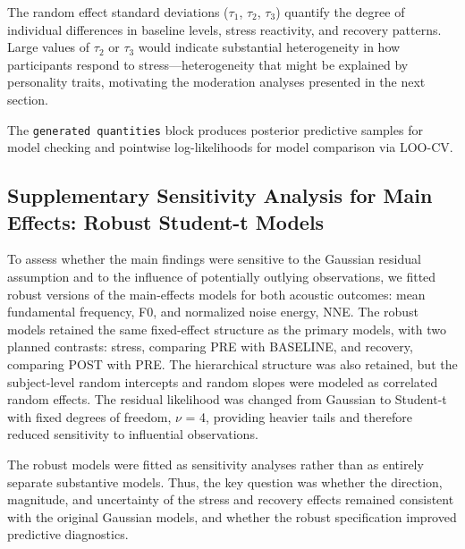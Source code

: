 \documentclass[
  english,
  man,floatsintext]{apa6}
\begin{document}
The random effect standard deviations (\(\tau_1\), \(\tau_2\), \(\tau_3\)) quantify the degree of individual differences in baseline levels, stress reactivity, and recovery patterns. Large values of \(\tau_2\) or \(\tau_3\) would indicate substantial heterogeneity in how participants respond to stress---heterogeneity that might be explained by personality traits, motivating the moderation analyses presented in the next section.

The \texttt{generated\ quantities} block produces posterior predictive samples for model checking and pointwise log-likelihoods for model comparison via LOO-CV.

\subsection{Supplementary Sensitivity Analysis for Main Effects: Robust Student-t Models}\label{supplementary-sensitivity-analysis-for-main-effects-robust-student-t-models}

To assess whether the main findings were sensitive to the Gaussian residual assumption and to the influence of potentially outlying observations, we fitted robust versions of the main-effects models for both acoustic outcomes: mean fundamental frequency, F0, and normalized noise energy, NNE. The robust models retained the same fixed-effect structure as the primary models, with two planned contrasts: stress, comparing PRE with BASELINE, and recovery, comparing POST with PRE. The hierarchical structure was also retained, but the subject-level random intercepts and random slopes were modeled as correlated random effects. The residual likelihood was changed from Gaussian to Student-t with fixed degrees of freedom, \(\nu\) = 4, providing heavier tails and therefore reduced sensitivity to influential observations.

The robust models were fitted as sensitivity analyses rather than as entirely separate substantive models. Thus, the key question was whether the direction, magnitude, and uncertainty of the stress and recovery effects remained consistent with the original Gaussian models, and whether the robust specification improved predictive diagnostics.
\end{document}
